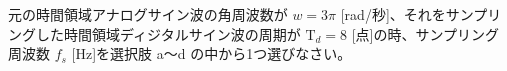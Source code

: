 元の時間領域アナログサイン波の角周波数が $w = 3\pi$ [rad/秒]、それをサンプリングした時間領域ディジタルサイン波の周期が $\textrm{T}_d = 8$ [点]の時、サンプリング周波数 $f_s$ [Hz]を選択肢 a〜d の中から1つ選びなさい。
